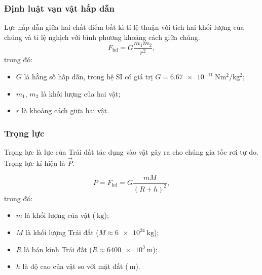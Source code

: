 \subsubsection{Định luật vạn vật hấp dẫn} 
	\begin{center}
\end{center}
Lực hấp dẫn giữa hai chất điểm bất kì tỉ lệ thuận với tích hai khối lượng của chúng và tỉ lệ nghịch với bình phương khoảng cách giữa chúng.
\begin{equation*}
	F_{\text {hd}} = G \dfrac {m_1 m_2 }{r^2},
\end{equation*}
trong đó:
\begin{itemize}
	\item $G$ là hằng số hấp dẫn, trong hệ SI có giá trị $G=\SI{6.67e-11}{\newton \meter ^2/\kilogram ^2}$;
	\item $m_1$, $m_2$ là khối lượng của hai vật;
	\item $r$ là khoảng cách giữa hai vật.
\end{itemize}

\subsubsection{Trọng lực }

Trọng lực là lực của Trái đất tác dụng vào vật gây ra cho chúng gia tốc rơi tự do. Trọng lực kí hiệu là $\vec P.$

\begin{equation*}
	P=F_{\text{hd}}=G \dfrac {mM}{(R+h)^2},
\end{equation*}
trong đó:
\begin{itemize}
	\item $m$ là khối lượng của vật ($\SI{}{\kilogram}$);
	\item $M$ là khối lượng Trái đất ($M \approx \SI{6e24}{\kilogram}$);
	\item $R$ là bán kính Trái đất ($R \approx \SI{6400e3}{\meter}$);
	\item $h$ là  độ cao của vật so với mặt đất ($\SI{}{\meter}$).
\end{itemize}

